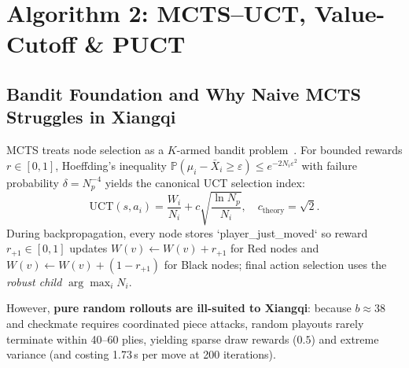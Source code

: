 \documentclass[conference]{IEEEtran}
\begin{document}
\section{Algorithm 2: MCTS--UCT, Value-Cutoff \& PUCT}
\subsection{Bandit Foundation and Why Naive MCTS Struggles in Xiangqi}
MCTS treats node selection as a $K$-armed bandit problem~\cite{auer2002,kocsis2006}. For bounded rewards $r \in [0,1]$, Hoeffding's inequality $\mathbb{P}(\mu_i - \bar{X}_i \ge \varepsilon) \le e^{-2N_i\varepsilon^2}$ with failure probability $\delta = N_p^{-4}$ yields the canonical UCT selection index:
\begin{equation}
\mathrm{UCT}(s, a_i) = \frac{W_i}{N_i} + c \sqrt{\frac{\ln N_p}{N_i}}, \quad c_{\text{theory}} = \sqrt{2}.
\end{equation}
During backpropagation, every node stores `player_just_moved` so reward $r_{+1} \in [0,1]$ updates $W(v) \leftarrow W(v) + r_{+1}$ for Red nodes and $W(v) \leftarrow W(v) + (1 - r_{+1})$ for Black nodes; final action selection uses the \emph{robust child} $\arg\max_i N_i$.

However, \textbf{pure random rollouts are ill-suited to Xiangqi}: because $b \approx 38$ and checkmate requires coordinated piece attacks, random playouts rarely terminate within 40--60 plies, yielding sparse draw rewards ($0.5$) and extreme variance (and costing 1.73\,s per move at 200 iterations).
\end{document}
